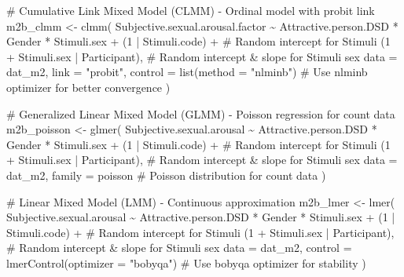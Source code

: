 \documentclass[
  bookmarksnumbered]{article}
\newenvironment{Shaded}{\begin{snugshade}}{\end{snugshade}}
\newcommand{\AttributeTok}[1]{\textcolor[rgb]{0.80,0.80,0.80}{#1}}
\newcommand{\CommentTok}[1]{\textcolor[rgb]{0.50,0.62,0.50}{#1}}
\newcommand{\DecValTok}[1]{\textcolor[rgb]{0.86,0.86,0.80}{#1}}
\newcommand{\FunctionTok}[1]{\textcolor[rgb]{0.94,0.94,0.56}{#1}}
\newcommand{\NormalTok}[1]{\textcolor[rgb]{0.80,0.80,0.80}{#1}}
\newcommand{\OtherTok}[1]{\textcolor[rgb]{0.94,0.94,0.56}{#1}}
\newcommand{\SpecialCharTok}[1]{\textcolor[rgb]{0.86,0.64,0.64}{#1}}
\newcommand{\StringTok}[1]{\textcolor[rgb]{0.80,0.58,0.58}{#1}}
\begin{document}
\begin{Shaded}
\begin{Highlighting}[]
\CommentTok{\# Cumulative Link Mixed Model (CLMM) {-} Ordinal model with probit link}
\NormalTok{m2b\_clmm }\OtherTok{\textless{}{-}} \FunctionTok{clmm}\NormalTok{(}
\NormalTok{  Subjective.sexual.arousal.factor }\SpecialCharTok{\textasciitilde{}}\NormalTok{ Attractive.person.DSD }\SpecialCharTok{*}\NormalTok{ Gender }\SpecialCharTok{*}\NormalTok{ Stimuli.sex }\SpecialCharTok{+}
\NormalTok{    (}\DecValTok{1} \SpecialCharTok{|}\NormalTok{ Stimuli.code) }\SpecialCharTok{+} \CommentTok{\# Random intercept for Stimuli}
\NormalTok{    (}\DecValTok{1} \SpecialCharTok{+}\NormalTok{ Stimuli.sex }\SpecialCharTok{|}\NormalTok{ Participant), }\CommentTok{\# Random intercept \& slope for Stimuli sex}
  \AttributeTok{data =}\NormalTok{ dat\_m2,}
  \AttributeTok{link =} \StringTok{"probit"}\NormalTok{,}
  \AttributeTok{control =} \FunctionTok{list}\NormalTok{(}\AttributeTok{method =} \StringTok{"nlminb"}\NormalTok{) }\CommentTok{\# Use \textquotesingle{}nlminb\textquotesingle{} optimizer for better convergence}
\NormalTok{)}

\CommentTok{\# Generalized Linear Mixed Model (GLMM) {-} Poisson regression for count data}
\NormalTok{m2b\_poisson }\OtherTok{\textless{}{-}} \FunctionTok{glmer}\NormalTok{(}
\NormalTok{  Subjective.sexual.arousal }\SpecialCharTok{\textasciitilde{}}\NormalTok{ Attractive.person.DSD }\SpecialCharTok{*}\NormalTok{ Gender }\SpecialCharTok{*}\NormalTok{ Stimuli.sex }\SpecialCharTok{+}
\NormalTok{    (}\DecValTok{1} \SpecialCharTok{|}\NormalTok{ Stimuli.code) }\SpecialCharTok{+} \CommentTok{\# Random intercept for Stimuli}
\NormalTok{    (}\DecValTok{1} \SpecialCharTok{+}\NormalTok{ Stimuli.sex }\SpecialCharTok{|}\NormalTok{ Participant), }\CommentTok{\# Random intercept \& slope for Stimuli sex}
  \AttributeTok{data =}\NormalTok{ dat\_m2,}
  \AttributeTok{family =}\NormalTok{ poisson }\CommentTok{\# Poisson distribution for count data}
\NormalTok{)}

\CommentTok{\# Linear Mixed Model (LMM) {-} Continuous approximation}
\NormalTok{m2b\_lmer }\OtherTok{\textless{}{-}} \FunctionTok{lmer}\NormalTok{(}
\NormalTok{  Subjective.sexual.arousal }\SpecialCharTok{\textasciitilde{}}\NormalTok{ Attractive.person.DSD }\SpecialCharTok{*}\NormalTok{ Gender }\SpecialCharTok{*}\NormalTok{ Stimuli.sex }\SpecialCharTok{+}
\NormalTok{    (}\DecValTok{1} \SpecialCharTok{|}\NormalTok{ Stimuli.code) }\SpecialCharTok{+} \CommentTok{\# Random intercept for Stimuli}
\NormalTok{    (}\DecValTok{1} \SpecialCharTok{+}\NormalTok{ Stimuli.sex }\SpecialCharTok{|}\NormalTok{ Participant), }\CommentTok{\# Random intercept \& slope for Stimuli sex}
  \AttributeTok{data =}\NormalTok{ dat\_m2,}
  \AttributeTok{control =} \FunctionTok{lmerControl}\NormalTok{(}\AttributeTok{optimizer =} \StringTok{"bobyqa"}\NormalTok{) }\CommentTok{\# Use \textquotesingle{}bobyqa\textquotesingle{} optimizer for stability}
\NormalTok{)}
\end{Highlighting}
\end{Shaded}
\end{document}
